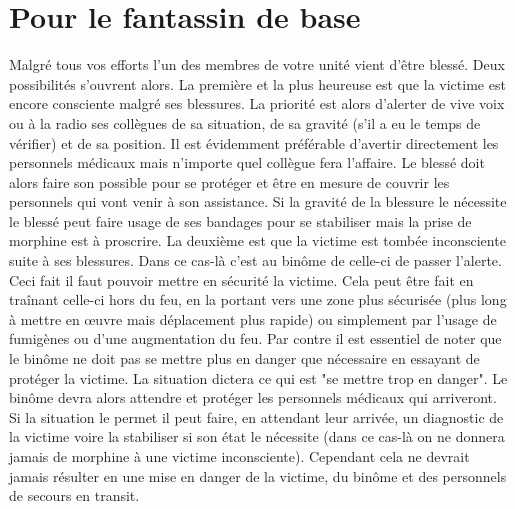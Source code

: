 \documentclass{article}
\begin{document}
		\section{Pour le fantassin de base}
			Malgré tous vos efforts l'un des membres de votre unité vient d'être blessé. Deux possibilités s'ouvrent alors. La première et la plus heureuse est que la victime est encore consciente malgré ses blessures. La priorité est alors d'alerter de vive voix ou à la radio ses collègues de sa situation, de sa gravité (s'il a eu le temps de vérifier) et de sa position. Il est évidemment préférable d'avertir directement les personnels médicaux mais n'importe quel collègue fera l'affaire. Le blessé doit alors faire son possible pour se protéger et être en mesure de couvrir les personnels qui vont venir à son assistance. Si la gravité de la blessure le nécessite le blessé peut faire usage de ses bandages pour se stabiliser mais la prise de morphine est à proscrire. La deuxième est que la victime est tombée inconsciente suite à ses blessures. Dans ce cas-là c'est au binôme de celle-ci de passer l'alerte. Ceci fait il faut pouvoir mettre en sécurité la victime. Cela peut être fait en traînant celle-ci hors du feu, en la portant vers une zone plus sécurisée (plus long à mettre en œuvre mais déplacement plus rapide) ou simplement par l'usage de fumigènes ou d'une augmentation du feu. Par contre il est essentiel de noter que le binôme ne doit pas se mettre plus en danger que nécessaire en essayant de protéger la victime. La situation dictera ce qui est "se mettre trop en danger". Le binôme devra alors attendre et protéger les personnels médicaux qui arriveront. Si la situation le permet il peut faire, en attendant leur arrivée, un diagnostic de la victime voire la stabiliser si son état le nécessite (dans ce cas-là on ne donnera jamais de morphine à une victime inconsciente). Cependant cela ne devrait jamais résulter en une mise en danger de la victime, du binôme et des personnels de secours en transit.\\
			
\end{document}
